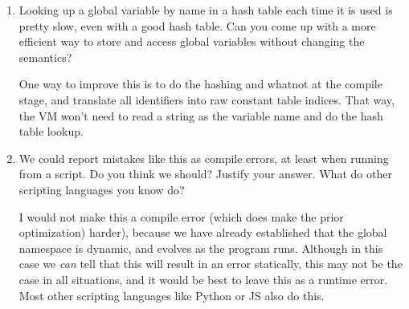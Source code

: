 \documentclass{article}
\begin{document}
\begin{enumerate}
    \item {
        Looking up a global variable by name in a hash table each time it is used is pretty slow, even with a good hash table. Can you come up with a more efficient way to store and access global variables without changing the semantics?

        One way to improve this is to do the hashing and whatnot at the compile 
        stage, and translate all identifiers into raw constant table indices.
        That way, the VM won't need to read a string as the variable name and 
        do the hash table lookup.
    }

    \item {
        We could report mistakes like this as compile errors, at least when running from a script. Do you think we should? Justify your answer. What do other scripting languages you know do?

        I would not make this a compile error (which does make the prior optimization)
        harder), because we have already established that the global namespace
        is dynamic, and evolves as the program runs. Although in this case we 
        \emph{can} tell that this will result in an error statically, this may 
        not be the case in all situations, and it would be best to leave this 
        as a runtime error. Most other scripting languages like Python or JS 
        also do this.
    }
\end{enumerate}
\end{document}
